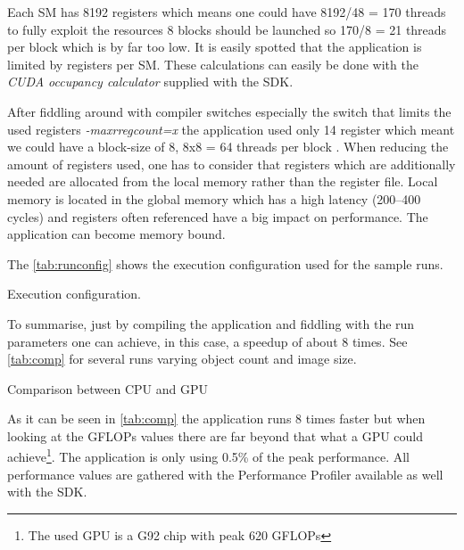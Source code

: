 Each \gls{SM} has 8192 registers which means one could have 8192/48 = 170 threads
to fully exploit the resources 8 blocks should be launched so 170/8 = 21 threads
per block which is by far too low. It is easily spotted that the application is
limited by registers per \gls{SM}. These calculations can easily be done with the
\emph{CUDA occupancy calculator} supplied with the \gls{SDK}.

After fiddling around with compiler switches especially the switch that limits
the used registers \emph{-maxrregcount=x}
the application used only 14 register which meant we could have a block-size of
8, 8x8 = 64 threads per block . When reducing the amount of registers used, one
has to consider that registers which are additionally needed are allocated from
the local memory rather than the register file. Local memory is located in the
global memory which has a high latency (200--400 cycles) and registers often
referenced have a big impact on performance. The application can become memory
bound.

The \autoref{tab:runconfig} shows the execution configuration used for the sample runs. 

\begin{table}[ht]
	\centering
  	\caption[Execution configuration]{Execution configuration.}	
	\label{tab:runconfig}
\end{table}



To summarise, just by compiling the application and fiddling with the run
parameters one can achieve, in this case, a speedup of about 8 times. See
\autoref{tab:comp} for several runs varying object count and image size.

\begin{table}[ht]
	\centering
	\caption{Comparison between \protect\gls{CPU} and \protect\gls{GPU}}
	\label{tab:comp}
\end{table}
	
	
As it can be seen in \autoref{tab:comp} the application runs 8 times faster but
when looking at the \glspl{GFLOP} values there are far beyond that what a
\gls{GPU} could achieve\footnote{The used \gls{GPU} is a G92 chip with peak 620
\glspl{GFLOP}}. The application is only using 0.5\% of the peak performance. All
performance values are gathered with the {} Performance
Profiler available as well with the \gls{SDK}.

